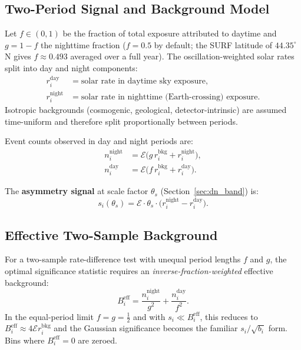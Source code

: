 \documentclass[12pt,a4paper]{article}
\newcommand{\Ecal}{\mathcal{E}}          %
\newcommand{\si}{s_{i}}                  %
\newcommand{\fd}{f}                      %
\newcommand{\fn}{g}                      %
\newcommand{\Beff}{B^{\mathrm{eff}}_{i}} %
\begin{document}
\subsection{Two-Period Signal and Background Model}
\label{sec:dn_model}

Let $\fd \in (0,1)$ be the fraction of total exposure attributed to
daytime and $\fn = 1 - \fd$ the nighttime fraction
($\fd = 0.5$ by default; the SURF latitude of $44.35^\circ$N gives
$\fd \approx 0.493$ averaged over a full year).
The oscillation-weighted solar rates split into day and night components:
\begin{align}
  r_i^{\mathrm{day}} &= \text{solar rate in daytime sky exposure},\\
  r_i^{\mathrm{night}} &= \text{solar rate in nighttime (Earth-crossing) exposure}.
\end{align}
Isotropic backgrounds (cosmogenic, geological, detector-intrinsic) are
assumed time-uniform and therefore split proportionally between periods.

Event counts observed in day and night periods are:
\begin{align}
  n_i^{\mathrm{night}} &= \Ecal\bigl(\fn\, r_i^{\mathrm{bkg}} + r_i^{\mathrm{night}}\bigr),
  \label{eq:dn_n_night}\\
  n_i^{\mathrm{day}}   &= \Ecal\bigl(\fd\, r_i^{\mathrm{bkg}} + r_i^{\mathrm{day}}\bigr).
  \label{eq:dn_n_day}
\end{align}

The \textbf{asymmetry signal} at scale factor $\theta_s$ (Section~\ref{sec:dn_band}) is:
\begin{equation}
  \si(\theta_s) = \Ecal\cdot\theta_s\cdot\bigl(r_i^{\mathrm{night}} - r_i^{\mathrm{day}}\bigr).
  \label{eq:dn_signal}
\end{equation}

\subsection{Effective Two-Sample Background}
\label{sec:dn_effective_bkg}

For a two-sample rate-difference test with unequal period lengths $\fd$ and
$\fn$, the optimal significance statistic requires an
\emph{inverse-fraction-weighted} effective background:
\begin{equation}
  \Beff = \frac{n_i^{\mathrm{night}}}{\fn^2}
         + \frac{n_i^{\mathrm{day}}}{\fd^2}.
  \label{eq:dn_Beff}
\end{equation}
In the equal-period limit $\fd=\fn=\tfrac{1}{2}$ and with $\si\ll\Beff$,
this reduces to $\Beff \approx 4\Ecal r_i^{\mathrm{bkg}}$ and the Gaussian
significance becomes the familiar $s_i / \sqrt{b_i}$ form.
Bins where $\Beff = 0$ are zeroed.
\end{document}
